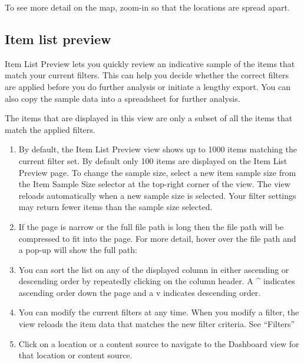\documentclass[letterpaper,10pt,english]{sphinxmanual}
\begin{document}
To see more detail on the map, zoom-in so that the locations are spread apart.


\subsection{Item list preview}
\label{\detokenize{mcdmp_app_ug:item-list-preview}}
Item List Preview lets you quickly review an indicative sample of the items that match your current filters. This can help you decide whether the correct filters are applied before you do further analysis or initiate a lengthy export. You can also copy the sample data into a spreadsheet for further analysis.

The items that are displayed in this view are only a subset of all the items that match the applied filters.

\begin{enumerate}
\item {} 
By default, the Item List Preview  view shows up to 1000 items matching the current filter set. By default only 100 items are displayed on the Item List Preview page. To change the sample size, select a new item sample size from the Item Sample Size selector at the top-right corner of the view. The view reloads automatically when a new sample size is selected. Your filter settings may return fewer items than the sample size selected.

\item {} 
If the page is narrow or the full file path is long then the file path will be compressed to fit into the page. For more detail, hover over the file path and a pop-up will show the full path:

\item {} 
You can sort the list on any of the displayed column in either ascending or descending order by repeatedly clicking on the column header. A \textasciicircum{} indicates ascending order down the page and a v indicates descending order.

\item {} 
You can modify the current filters at any time. When you modify a filter, the view reloads the item data that matches the new filter criteria. See “Filters”

\item {} 
Click on a location or a content source to navigate to the Dashboard view for that location or content source.

\end{enumerate}
\end{document}
